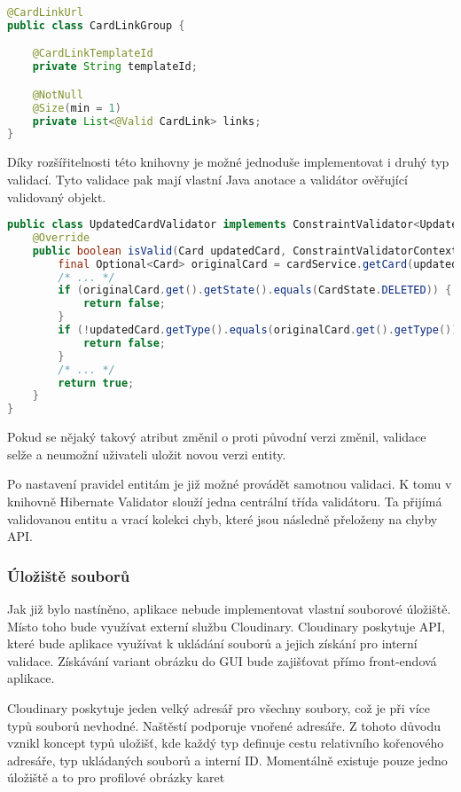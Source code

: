 		\begin{lstlisting}[language=Java, caption={Ukázka třídy s validačními pravidly pomocí Java anotací. Zdroj: [autor]}]
@CardLinkUrl
public class CardLinkGroup {

	@CardLinkTemplateId
	private String templateId;

	@NotNull
	@Size(min = 1)
	private List<@Valid CardLink> links;
}
		\end{lstlisting}

		Díky rozšířitelnosti této knihovny je možné jednoduše implementovat i druhý typ validací.
		Tyto validace pak mají vlastní Java anotace a validátor ověřující validovaný objekt.

		\begin{lstlisting}[language=Java, caption={kázka validátoru ověřující neměnitelné atributy upravené karty oproti její původní verzi. Zdroj: [autor]}]
public class UpdatedCardValidator implements ConstraintValidator<UpdatedCard, Card> {
	@Override
	public boolean isValid(Card updatedCard, ConstraintValidatorContext context) {
		final Optional<Card> originalCard = cardService.getCard(updatedCard.getId(), true);
		/* ... */
		if (originalCard.get().getState().equals(CardState.DELETED)) {
			return false;
		}
		if (!updatedCard.getType().equals(originalCard.get().getType())) {
			return false;
		}
		/* ... */
		return true;
	}
}
		\end{lstlisting}

		Pokud se nějaký takový atribut změnil o proti původní verzi změnil, validace selže a neumožní uživateli
		uložit novou verzi entity.

		Po nastavení pravidel entitám je již možné provádět samotnou validaci.
		K tomu v knihovně Hibernate Validator slouží jedna centrální třída validátoru.
		Ta přijímá validovanou entitu a vrací kolekci chyb, které jsou následně přeloženy na chyby \ac{API}.

		\subsubsection{Úložiště souborů}

		Jak již bylo nastíněno, aplikace nebude implementovat vlastní souborové úložiště.
		Místo toho bude využívat externí službu Cloudinary.
		Cloudinary poskytuje \ac{API}, které bude aplikace využívat k ukládání souborů a jejich získání pro
		interní validace.
		Získávání variant obrázku do \ac{GUI} bude zajišťovat přímo front-endová aplikace.

		Cloudinary poskytuje jeden velký adresář pro všechny soubory, což je při více typů souborů nevhodné.
		Naštěstí podporuje vnořené adresáře.
		Z tohoto důvodu vznikl koncept typů uložišť, kde každý typ definuje cestu
		relativního kořenového adresáře, typ ukládaných souborů a interní ID.
		Momentálně existuje pouze jedno úložiště a to pro profilové obrázky karet

